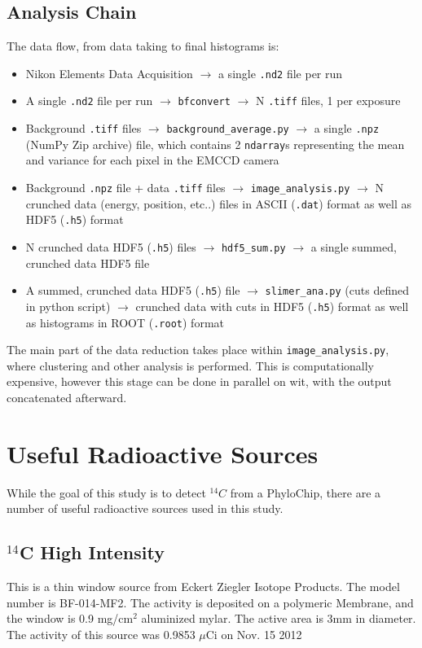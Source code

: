 \documentclass[11pt]{article}
\newcommand{\nuc}[2]{\ensuremath{^{#1}}#2}
\begin{document}
\subsection{Analysis Chain}
The data flow, from data taking to final histograms is:
\begin{itemize}
	\item Nikon Elements Data Acquisition $\rightarrow$ a single \verb+.nd2+ file per run
	\item A single \verb+.nd2+ file per run $\rightarrow$ \verb+bfconvert+ $\rightarrow$ N \verb+.tiff+ files, 1 per exposure
	\item  Background \verb+.tiff+ files $\rightarrow$ \verb+background_average.py+ $\rightarrow$ a single \verb+.npz+ (NumPy Zip archive) file, which contains 2 \verb+ndarray+s representing the mean and variance for each pixel in the EMCCD camera
	\item Background  \verb+.npz+ file + data \verb+.tiff+ files  $\rightarrow$ \verb+image_analysis.py+ $\rightarrow$ N crunched data  (energy, position, etc..) files in ASCII (\verb+.dat+) format as well as HDF5 (\verb+.h5+) format
	\item  N crunched data HDF5 (\verb+.h5+) files $\rightarrow$  \verb+hdf5_sum.py+ $\rightarrow$ a single summed, crunched data HDF5 file 
	\item A summed, crunched data HDF5 (\verb+.h5+) file  $\rightarrow$ \verb+slimer_ana.py+ (cuts defined in python script) $\rightarrow$ crunched data with cuts in HDF5 (\verb+.h5+) format as well as histograms in ROOT (\verb+.root+) format
	\end{itemize}
The main part of the data reduction takes place within \verb+image_analysis.py+, where clustering and other analysis is performed. This is computationally expensive, however this stage can be done in parallel on wit, with the output concatenated afterward. 



\section{Useful Radioactive Sources} %
While the goal of this study is to detect $^{14}C$ from a PhyloChip, there are a number of useful radioactive sources used in this study. 
\subsection{\nuc{14}{C} High Intensity}
This is a thin window source from Eckert Ziegler Isotope Products. The model number is BF-014-MF2. The activity is deposited on a polymeric Membrane, and the window is 0.9 mg/cm$^{2}$ aluminized mylar.
The active area is 3mm in diameter. The activity of this source was 0.9853 $\mu$Ci on Nov. 15 2012
\end{document}
